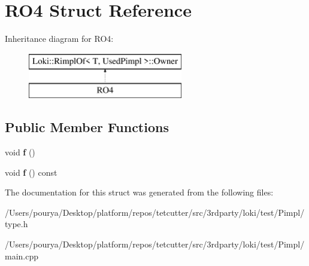 \hypertarget{structRO4}{}\section{R\+O4 Struct Reference}
\label{structRO4}
Inheritance diagram for R\+O4\+:\begin{figure}[H]
\begin{center}
\leavevmode
\includegraphics[height=2.000000cm]{structRO4}
\end{center}
\end{figure}
\subsection*{Public Member Functions}
\begin{DoxyCompactItemize}
\item 
\hypertarget{structRO4_a22f96445f92f9eaea598be7a254785d6}{}void {\bfseries f} ()\label{structRO4_a22f96445f92f9eaea598be7a254785d6}

\item 
\hypertarget{structRO4_a5fe342e4cfbe21267711cfac51d8f413}{}void {\bfseries f} () const \label{structRO4_a5fe342e4cfbe21267711cfac51d8f413}

\end{DoxyCompactItemize}


The documentation for this struct was generated from the following files\+:\begin{DoxyCompactItemize}
\item 
/\+Users/pourya/\+Desktop/platform/repos/tetcutter/src/3rdparty/loki/test/\+Pimpl/type.\+h\item 
/\+Users/pourya/\+Desktop/platform/repos/tetcutter/src/3rdparty/loki/test/\+Pimpl/main.\+cpp\end{DoxyCompactItemize}
